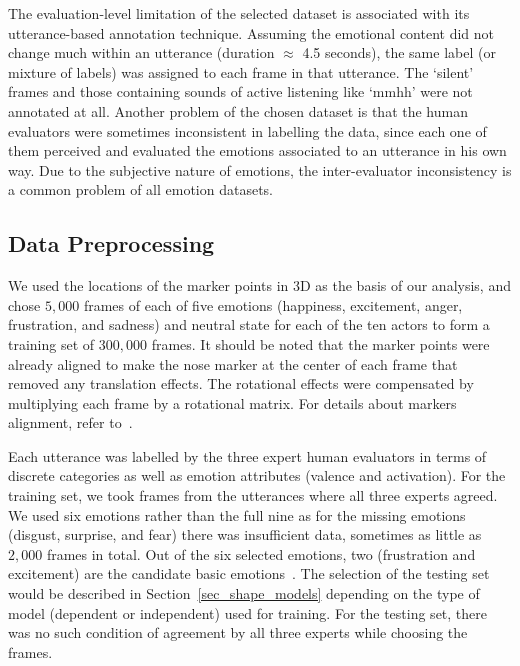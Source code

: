 \documentclass[10pt,journal,cspaper,compsoc]{IEEEtran}
\begin{document}
The evaluation-level limitation of the selected dataset is associated with its utterance-based annotation technique. Assuming the emotional content did not change much within an utterance (duration $\approx$ 4.5 seconds), the same label (or mixture of labels) was assigned to each frame in that utterance. The `silent' frames and those containing sounds of active listening like `mmhh' were not annotated at all. Another problem of the chosen dataset is that the human evaluators were sometimes inconsistent in labelling the data, since each one of them perceived and evaluated the emotions associated to an utterance in his own way. Due to the subjective nature of emotions, the inter-evaluator inconsistency is a common problem of all emotion datasets.

\subsection{Data Preprocessing}
\label{sec_data_preprocessing}
We used the locations of the marker points in 3D as the basis of our analysis, and chose $5,000$ frames of each of five emotions (happiness, excitement, anger, frustration, and sadness) and neutral state for each of the ten actors to form a training set of $300,000$ frames. It should be noted that the marker points were already aligned to make the nose marker at the center of each frame that removed any translation effects. The rotational effects were compensated by multiplying each frame by a rotational matrix. For details about markers alignment, refer to~\cite{Busso08}. 

Each utterance was labelled by the three expert human evaluators in terms of discrete categories as well as emotion attributes (valence and activation). For the training set, we took frames from the utterances where all three experts agreed. We used six emotions rather than the full nine as for the missing emotions (disgust, surprise, and fear) there was insufficient data, sometimes as little as $2,000$ frames in total. Out of the six selected emotions, two (frustration and excitement) are the candidate basic emotions~\cite{ortony1990s, ekman1999basic}. The selection of the testing set would be described in Section~\ref{sec_shape_models} depending on the type of model (dependent or independent) used for training. For the testing set, there was no such condition of agreement by all three experts while choosing the frames.
\end{document}
